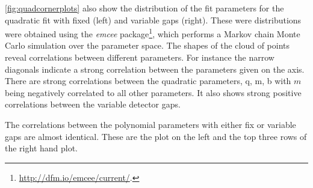 
\cref{fig:quadcornerplots} also show the distribution of the fit parameters for the quadratic fit with fixed (left) and variable gaps (right). These were distributions were obtained using the \textit{emcee} \Python{} package\footnote{\href{http://dfm.io/emcee/current/}{\url{http://dfm.io/emcee/current/}}.}, which performs a Markov chain Monte Carlo simulation over the parameter space.
The shapes of the cloud of points reveal correlations between different parameters.
For instance the narrow diagonals indicate a strong correlation between the parameters given on the axis.
There are strong correlations between the quadratic parameters, {q, m, b} with $m$ being negatively correlated to all other parameters.
It also shows strong positive correlations between the variable detector gaps.

The correlations between the polynomial parameters with either fix or variable gaps are almost identical. 
These are the plot on the left and the top three rows of the right hand plot.




